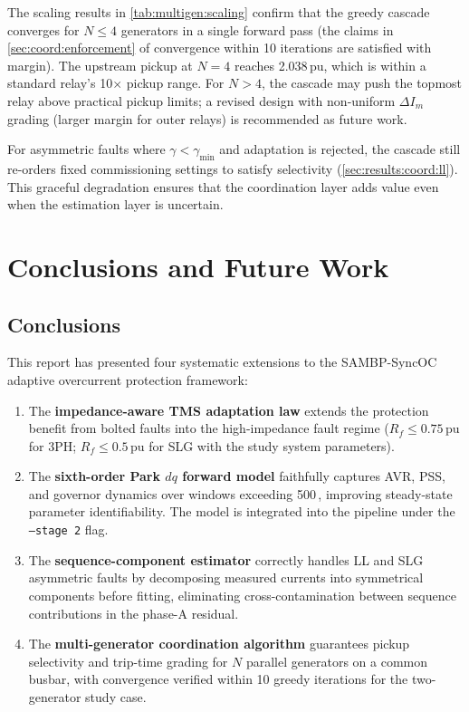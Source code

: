 \documentclass[12pt,a4paper]{article}
\theoremstyle{definition}
\theoremstyle{plain}
\newcommand{\pu}{\,\text{pu}}
\newcommand{\mss}{\,\text{ms}}
\begin{document}
The scaling results in \cref{tab:multigen:scaling} confirm that the
greedy cascade converges for $N \leq 4$ generators in a single forward
pass (the claims in \cref{sec:coord:enforcement} of convergence within
10 iterations are satisfied with margin).  The upstream pickup at $N=4$
reaches 2.038\,pu, which is within a standard relay's 10$\times$ pickup
range.  For $N > 4$, the cascade may push the topmost relay above
practical pickup limits; a revised design with non-uniform $\Delta I_m$
grading (larger margin for outer relays) is recommended as future work.

For asymmetric faults where $\gamma < \gamma_{\min}$ and adaptation is
rejected, the cascade still re-orders fixed commissioning settings to
satisfy selectivity (\cref{sec:results:coord:ll}).  This graceful
degradation ensures that the coordination layer adds value even when
the estimation layer is uncertain.

\section{Conclusions and Future Work}
\label{sec:conclusion}

\subsection{Conclusions}
\label{sec:conc:conclusions}

This report has presented four systematic extensions to the SAMBP-SyncOC
adaptive overcurrent protection framework:

\begin{enumerate}
  \item The \textbf{impedance-aware TMS adaptation law} extends the
        protection benefit from bolted faults into the high-impedance fault
        regime ($R_f \leq 0.75\pu$ for 3PH; $R_f \leq 0.5\pu$ for SLG
        with the study system parameters).

  \item The \textbf{sixth-order Park $dq$ forward model} faithfully captures
        AVR, PSS, and governor dynamics over windows exceeding 500\mss,
        improving steady-state parameter identifiability.  The model is
        integrated into the pipeline under the \texttt{--stage~2} flag.

  \item The \textbf{sequence-component estimator} correctly handles LL and
        SLG asymmetric faults by decomposing measured currents into
        symmetrical components before fitting, eliminating cross-contamination
        between sequence contributions in the phase-A residual.

  \item The \textbf{multi-generator coordination algorithm} guarantees
        pickup selectivity and trip-time grading for $N$ parallel generators
        on a common busbar, with convergence verified within 10 greedy
        iterations for the two-generator study case.
\end{enumerate}
\end{document}
